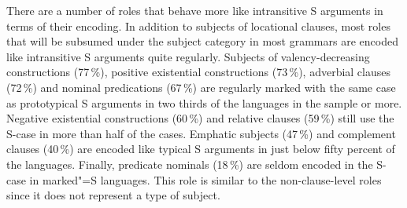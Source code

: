 There are a number of roles that behave more like intransitive S arguments in terms of their encoding.
In addition to subjects of locational clauses, most roles that will be subsumed under the subject category in most grammars are encoded like intransitive S arguments quite regularly. Subjects of %
valency-decreasing constructions (77\,\%), positive existential constructions (73\,\%), adverbial clauses (72\,\%) and nominal predications (67\,\%) are regularly marked with the same case as prototypical S arguments in two thirds of the languages in the sample or more. 
Negative existential constructions (60\,\%) and relative clauses (59\,\%) still use the S-case in more than half of the cases. 
Emphatic subjects (47\,\%) and complement clauses (40\,\%) are encoded like typical S arguments in just below fifty percent of the languages.
Finally, predicate nominals (18\,\%) are seldom encoded in the S-case in marked"=S languages. 
This role is similar to the non-clause-level roles since it does not represent a type of subject.


